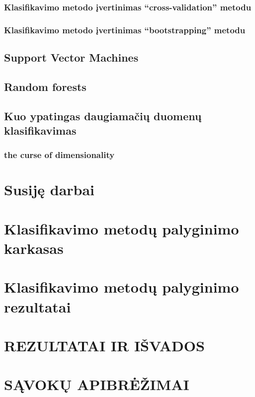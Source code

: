 \documentclass{article}
\begin{document}
\subsubsection{Klasifikavimo metodo įvertinimas ``cross-validation'' metodu}
\subsubsection{Klasifikavimo metodo įvertinimas ``bootstrapping'' metodu}
\subsection{Support Vector Machines}
\subsection{Random forests}
\subsection{Kuo ypatingas daugiamačių duomenų klasifikavimas}
\subsubsection{the curse of dimensionality}

\section{Susiję darbai}
\section{Klasifikavimo metodų palyginimo karkasas}
\section{Klasifikavimo metodų palyginimo rezultatai}

\section*{REZULTATAI IR IŠVADOS}


\section*{SĄVOKŲ APIBRĖŽIMAI}




\end{document}
